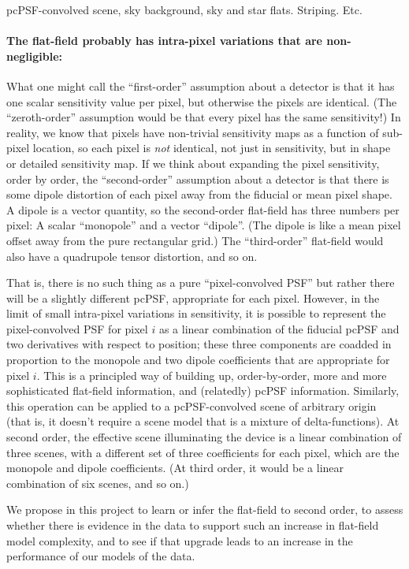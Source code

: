 \documentclass[12pt,preprint]{aastex}
\begin{document}
pcPSF-convolved scene, sky background, sky and star flats.  Striping.  Etc.

\paragraph{The flat-field probably has intra-pixel variations that are non-negligible:}

What one might call the ``first-order'' assumption about a detector is
that it has one scalar sensitivity value per pixel, but otherwise the
pixels are identical.
(The ``zeroth-order'' assumption would be that every pixel has the same
sensitivity!)
In reality, we know that pixels have non-trivial sensitivity maps as a
function of sub-pixel location, so each pixel is \emph{not} identical,
not just in sensitivity, but in shape or detailed sensitivity map.
If we think about expanding the pixel sensitivity, order by order, the
``second-order'' assumption about a detector is that there is some dipole
distortion of each pixel away from the fiducial or mean pixel shape.
A dipole is a vector quantity, so the second-order flat-field has
three numbers per pixel: A scalar ``monopole'' and a vector
``dipole''.
(The dipole is like a mean pixel offset away from the pure rectangular
grid.)
The ``third-order'' flat-field would also have a quadrupole tensor
distortion, and so on.

That is, there is no such thing as a pure ``pixel-convolved PSF'' but
rather there will be a slightly different pcPSF,
appropriate for each pixel.
However, in the limit of small intra-pixel variations in sensitivity,
it is possible to represent the pixel-convolved PSF for pixel $i$ as a
linear combination of the fiducial pcPSF and two
derivatives with respect to position; these three components are
coadded in proportion to the monopole and two dipole coefficients
that are appropriate for pixel $i$.
This is a principled way of building up, order-by-order, more and more
sophisticated flat-field information, and (relatedly) pcPSF
information.
Similarly, this operation can be applied to a pcPSF-convolved scene of
arbitrary origin (that is, it doesn't require a scene model that is
a mixture of delta-functions).
At second order, the effective scene illuminating the device is a
linear combination of three scenes, with a different set of three
coefficients for each pixel, which are the monopole and dipole
coefficients.
(At third order, it would be a linear combination of six scenes, and
so on.)

We propose in this project to learn or infer the flat-field to second
order, to assess whether there is evidence in the data to support such
an increase in flat-field model complexity, and to see if that upgrade
leads to an increase in the performance of our models of the data.
\end{document}

